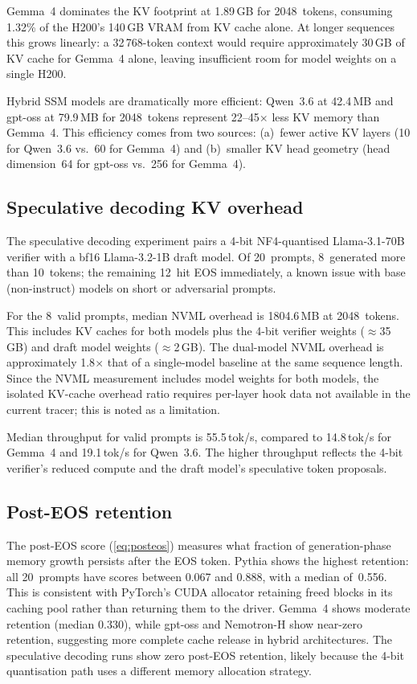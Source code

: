 \documentclass[11pt,a4paper]{article}
\begin{document}
Gemma~4 dominates the KV footprint at 1.89\,GB for 2048~tokens,
consuming 1.32\% of the H200's 140\,GB VRAM from KV cache alone.
At longer sequences this grows linearly: a 32\,768-token context
would require approximately 30\,GB of KV cache for Gemma~4 alone,
leaving insufficient room for model weights on a single H200.

Hybrid SSM models are dramatically more efficient:
Qwen~3.6 at 42.4\,MB and gpt-oss at 79.9\,MB for 2048~tokens
represent 22--45$\times$ less KV memory than Gemma~4.
This efficiency comes from two sources:
(a)~fewer active KV layers (10 for Qwen~3.6 vs.\ 60 for Gemma~4)
and (b)~smaller KV head geometry (head dimension~64 for gpt-oss
vs.\ 256 for Gemma~4).

\subsection{Speculative decoding KV overhead}
\label{sec:results:spec}

The speculative decoding experiment pairs a 4-bit NF4-quantised
Llama-3.1-70B verifier with a bf16 Llama-3.2-1B draft model.
Of 20~prompts, 8~generated more than 10~tokens; the remaining
12~hit EOS immediately, a known issue with base (non-instruct)
models on short or adversarial prompts.

For the 8~valid prompts, median NVML overhead is 1804.6\,MB at
2048~tokens.
This includes KV caches for both models plus the 4-bit verifier
weights ($\approx$35\,GB) and draft model weights
($\approx$2\,GB).
The dual-model NVML overhead is approximately 1.8$\times$ that
of a single-model baseline at the same sequence length.
Since the NVML measurement includes model weights for both
models, the isolated KV-cache overhead ratio requires
per-layer hook data not available in the current tracer;
this is noted as a limitation.

Median throughput for valid prompts is 55.5\,tok/s, compared to
14.8\,tok/s for Gemma~4 and 19.1\,tok/s for Qwen~3.6.
The higher throughput reflects the 4-bit verifier's reduced
compute and the draft model's speculative token proposals.

\subsection{Post-EOS retention}
\label{sec:results:posteos}

The post-EOS score (\cref{eq:posteos}) measures what fraction of
generation-phase memory growth persists after the EOS token.
Pythia shows the highest retention: all 20~prompts have scores
between 0.067 and 0.888, with a median of~0.556.
This is consistent with PyTorch's CUDA allocator retaining freed
blocks in its caching pool rather than returning them to the
driver.
Gemma~4 shows moderate retention (median 0.330), while gpt-oss
and Nemotron-H show near-zero retention, suggesting more complete
cache release in hybrid architectures.
The speculative decoding runs show zero post-EOS retention,
likely because the 4-bit quantisation path uses a different
memory allocation strategy.
\end{document}
